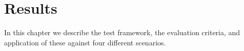 \chapter{Results}
In this chapter we describe the test framework, the evaluation criteria, and application of these against four different scenarios. 


